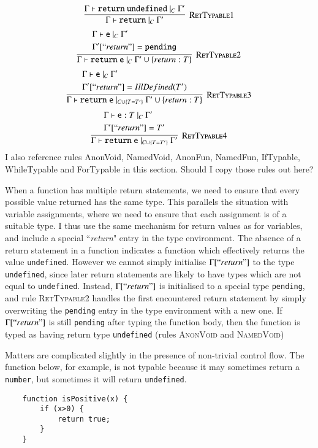 \documentclass[12pt,a4paper,twoside,openright]{report}
\newcommand*{\js}{\texttt}
\begin{document}
$$\infer[\textsc{RetTypable1}]{
	\Gamma \vdash \mathtt{return}\ |_C\ \Gamma'
}{
	\Gamma \vdash \mathtt{return\ undefined}\ |_C\ \Gamma'
}$$
$$\infer[\textsc{RetTypable2}]{
	\Gamma \vdash \mathtt{return\ e}\ |_C\ \Gamma'\cup\{return: T\}
}{
  \begin{split}
	&\Gamma \vdash \mathtt{e}\ |_C\ \Gamma'\\
	&\Gamma'[``return"] = \mathtt{pending}
  \end{split}
}$$
$$\infer[\textsc{RetTypable3}]{
	\Gamma \vdash \mathtt{return\ e}\ |_{C\cup\{T=T'\}}\ \Gamma'\cup\{return: T\}
}{
  \begin{split}
	&\Gamma \vdash \mathtt{e}\ |_C\ \Gamma'\\
	&\Gamma'[``return"] = IllDefined(T')
  \end{split}
}$$
$$\infer[\textsc{RetTypable4}]{
	\Gamma \vdash \mathtt{return\ e}\ |_{C\cup\{T=T'\}}\ \Gamma'
}{
  \begin{split}
	&\Gamma \vdash \mathtt{e}:T\ |_C\ \Gamma'\\
	&\Gamma'[``return"] = T'
  \end{split}
}$$
{\color{red} I also reference rules AnonVoid, NamedVoid, AnonFun, NamedFun,
  IfTypable, WhileTypable and ForTypable in this section. Should I copy those
  rules out here? }

When a function has multiple return statements, we need to ensure that every
possible value returned has the same type.  This parallels the situation with
variable assignments, where we need to ensure that each assignment is of a
suitable type. I thus use the same mechanism for return values as for
variables, and include a special ``\textit{return}" entry in the type
environment. The absence of a return statement in a function indicates a
function which effectively returns the value \js{undefined}.  However we cannot
simply initialise $\Gamma[``return"]$ to the type \texttt{undefined}, since
later return statements are likely to have types which are not equal to
\texttt{undefined}. Instead, $\Gamma[``return"]$ is initialised to a special
type \texttt{pending}, and rule \textsc{RetTypable2} handles the first
encountered return statement by simply overwriting the \texttt{pending} entry
in the type environment with a new one. If $\Gamma[``return"]$ is still
\texttt{pending} after typing the function body, then the function is typed as
having return type \texttt{undefined} (rules \textsc{AnonVoid} and
\textsc{NamedVoid})

Matters are complicated slightly in the presence of non-trivial control flow.
The function below, for example, is not typable because it may sometimes return
a \texttt{number}, but sometimes it will return \texttt{undefined}.
\begin{program}[H]
  \begin{verbatim}
	function isPositive(x) {
		if (x>0) {
			return true;
		}
	}
  \end{verbatim}
\end{program}
\end{document}
